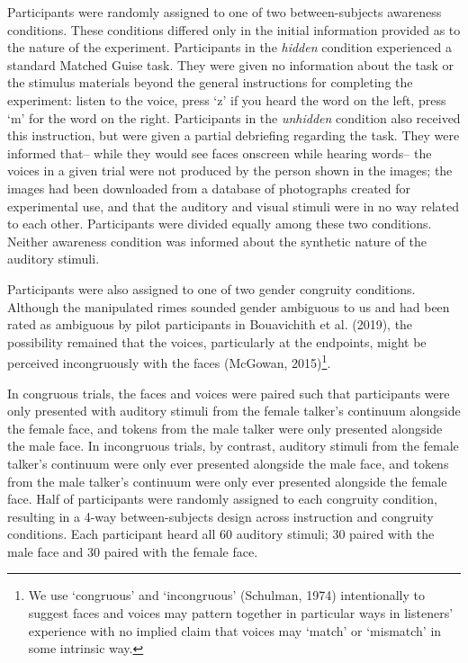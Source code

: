\documentclass[
  letterpaper,
  DIV=11,
  numbers=noendperiod]{scrartcl}
\begin{document}
Participants were randomly assigned to one of two between-subjects
awareness conditions. These conditions differed only in the initial
information provided as to the nature of the experiment. Participants in
the \emph{hidden} condition experienced a standard Matched Guise task.
They were given no information about the task or the stimulus materials
beyond the general instructions for completing the experiment: listen to
the voice, press `z' if you heard the word on the left, press `m' for
the word on the right. Participants in the \emph{unhidden} condition
also received this instruction, but were given a partial debriefing
regarding the task. They were informed that-- while they would see faces
onscreen while hearing words-- the voices in a given trial were not
produced by the person shown in the images; the images had been
downloaded from a database of photographs created for experimental use,
and that the auditory and visual stimuli were in no way related to each
other. Participants were divided equally among these two conditions.
Neither awareness condition was informed about the synthetic nature of
the auditory stimuli.

Participants were also assigned to one of two gender congruity
conditions. Although the manipulated rimes sounded gender ambiguous to
us and had been rated as ambiguous by pilot participants in Bouavichith
et al. (2019), the possibility remained that the voices, particularly at
the endpoints, might be perceived incongruously with the faces (McGowan,
2015)\footnote{We use `congruous' and `incongruous' (Schulman, 1974)
  intentionally to suggest faces and voices may pattern together in
  particular ways in listeners' experience with no implied claim that
  voices may `match' or `mismatch' in some intrinsic way.}.

In congruous trials, the faces and voices were paired such that
participants were only presented with auditory stimuli from the female
talker's continuum alongside the female face, and tokens from the male
talker were only presented alongside the male face. In incongruous
trials, by contrast, auditory stimuli from the female talker's continuum
were only ever presented alongside the male face, and tokens from the
male talker's continuum were only ever presented alongside the female
face. Half of participants were randomly assigned to each congruity
condition, resulting in a 4-way between-subjects design across
instruction and congruity conditions. Each participant heard all 60
auditory stimuli; 30 paired with the male face and 30 paired with the
female face.
\end{document}
